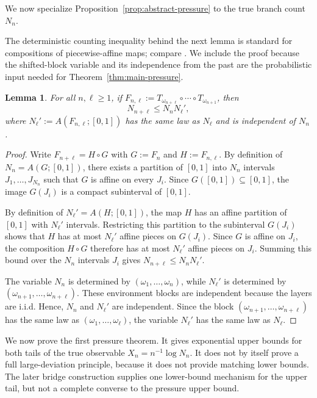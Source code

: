 \documentclass[11pt]{amsart}
\numberwithin{equation}{section}
\theoremstyle{plain}
\newtheorem{lemma}[theorem]{Lemma}
\theoremstyle{definition}
\theoremstyle{remark}
\begin{document}
We now specialize Proposition~\ref{prop:abstract-pressure} to the true branch count \(N_n\).


The deterministic counting inequality behind the next lemma is standard for
compositions of piecewise-affine maps; compare
\cite[Sec.~6.1]{PetersenZech2024}. We include the proof because the
shifted-block variable and its independence from the past are the probabilistic
input needed for Theorem~\ref{thm:main-pressure}.

\begin{lemma}\label{lem:submultiplicative-N}
For all \(n,\ell\ge1\), if \(F_{n,\ell}:=T_{\omega_{n+\ell}}\circ\cdots\circ T_{\omega_{n+1}}\), then
\[
N_{n+\ell}\le N_nN_\ell',
\]
where \(N_\ell':=A(F_{n,\ell};[0,1])\) has the same law as \(N_\ell\) and is independent of \(N_n\).
\end{lemma}

\begin{proof}
Write \(F_{n+\ell}=H\circ G\) with \(G:=F_n\) and \(H:=F_{n,\ell}\). By definition of \(N_n=A(G;[0,1])\), there exists a partition of \([0,1]\) into \(N_n\) intervals \(J_1,\dots,J_{N_n}\) such that \(G\) is affine on every \(J_i\). Since \(G([0,1])\subseteq[0,1]\), the image \(G(J_i)\) is a compact subinterval of \([0,1]\).

By definition of \(N_\ell'=A(H;[0,1])\), the map \(H\) has an affine partition of \([0,1]\) with \(N_\ell'\) intervals. Restricting this partition to the subinterval \(G(J_i)\) shows that \(H\) has at most \(N_\ell'\) affine pieces on \(G(J_i)\). Since \(G\) is affine on \(J_i\), the composition \(H\circ G\) therefore has at most \(N_\ell'\) affine pieces on \(J_i\). Summing this bound over the \(N_n\) intervals \(J_i\) gives \(N_{n+\ell}\le N_nN_\ell'\).

The variable \(N_n\) is determined by \((\omega_1,\dots,\omega_n)\), while \(N_\ell'\) is determined by \((\omega_{n+1},\dots,\omega_{n+\ell})\). These environment blocks are independent because the layers are i.i.d. Hence, \(N_n\) and \(N_\ell'\) are independent. Since the block \((\omega_{n+1},\dots,\omega_{n+\ell})\) has the same law as \((\omega_1,\dots,\omega_\ell)\), the variable \(N_\ell'\) has the same law as \(N_\ell\).
\end{proof}

We now prove the first pressure theorem. It  gives exponential upper bounds for both tails of the true observable \(X_n=n^{-1}\log N_n\). It does not by itself prove a full large-deviation principle, because it does not provide matching lower bounds. The later bridge construction supplies one lower-bound mechanism for the upper tail, but not a complete converse to the pressure upper bound.
\end{document}
